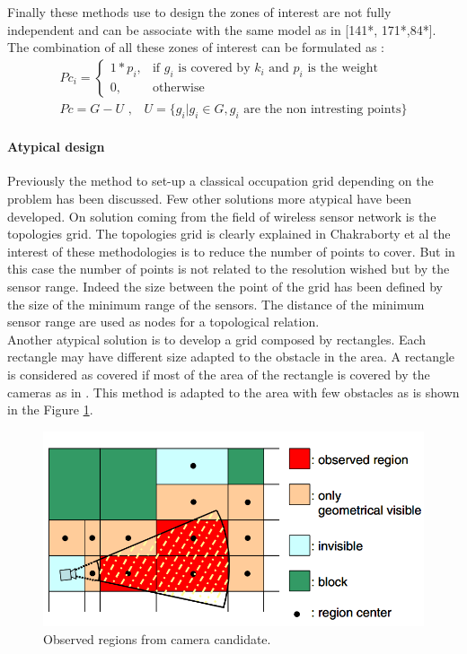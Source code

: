 Finally  these methods use to design the zones of interest are not fully independent and can be associate with the same model as in \cite{141*akbarzadeh2013,171*horster2006,84*xu2011} [141*, 171*,84*]. The combination of all these  zones of interest can be formulated as : 
 \begin{align}\label{eq:PcFull}
Pc_i= \begin{cases} 1*p_i, & \mbox{if } g_i\mbox{ is covered  by $k_i$ and  $p_i$ is the weight} \\ 0, & \mbox{otherwise}  \end{cases}
\\ Pc=G-U \mbox{ ,    }  \mbox{ }U= \{ g_i | g_i \in G, g_i \mbox{ are the non intresting points} \}
\end{align}

   
\paragraph*{Atypical design}  

Previously the method to set-up a classical occupation grid depending on the problem has been discussed. Few other solutions more atypical have been developed. On solution coming from the field of wireless sensor network is the topologies grid. 
 The topologies grid is clearly explained in Chakraborty et al \cite{150*chakrabarty2002} the interest of these methodologies is to reduce the number of points to cover. But in this case the number of points is not related to the resolution wished  but by the sensor range. Indeed the size between the point of the grid has been defined by the size of the minimum range of the sensors. The distance of the minimum sensor range are used as nodes for a topological relation. \\
Another atypical solution is to develop a grid composed by rectangles. Each rectangle may have different size adapted to the obstacle in the area. A rectangle is considered as covered if most of the area of the rectangle is covered by the cameras as in \citep{170*yabuta2008}. This method is adapted to the area with few obstacles as is shown in the Figure \ref{fig:from170}.
\begin{figure}[t!]
\begin{center}
   \includegraphics[width=\linewidth]{img/from170.png}
  \caption{ Observed regions from camera candidate.}\label{fig:from170}
  \endminipage\hfill
  \end{center}
\end{figure}

